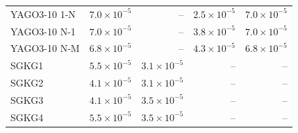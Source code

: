 \begin{tabular}{lrrrr}
YAGO3-10 1-N & $7.0\times10^{-5}$ & – & $2.5\times10^{-5}$ & $7.0\times10^{-5}$ \\
YAGO3-10 N-1 & $7.0\times10^{-5}$ & – & $3.8\times10^{-5}$ & $7.0\times10^{-5}$ \\
YAGO3-10 N-M & $6.8\times10^{-5}$ & – & $4.3\times10^{-5}$ & $6.8\times10^{-5}$ \\
\midrule
SGKG1 & $5.5\times10^{-5}$ & $3.1\times10^{-5}$ & – & – \\
SGKG2 & $4.1\times10^{-5}$ & $3.1\times10^{-5}$ & – & – \\
SGKG3 & $4.1\times10^{-5}$ & $3.5\times10^{-5}$ & – & – \\
SGKG4 & $5.5\times10^{-5}$ & $3.5\times10^{-5}$ & – & – \\
\bottomrule
\end{tabular}
